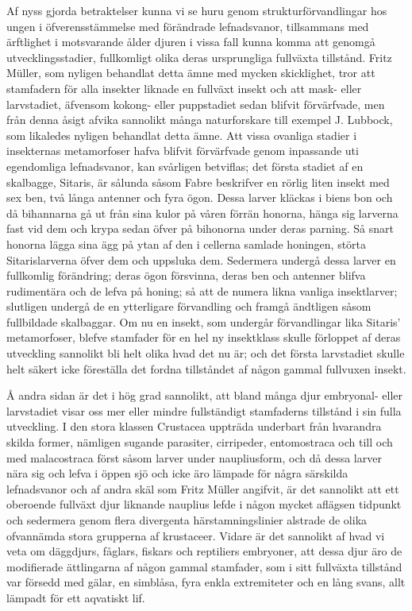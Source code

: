 Af nyss gjorda betraktelser kunna vi se huru genom strukturförvandlingar hos ungen i öfverensstämmelse med förändrade lefnadsvanor, tillsammans med ärftlighet i motsvarande ålder djuren i vissa fall kunna komma att genomgå utvecklingsstadier, fullkomligt olika deras ursprungliga fullväxta tillstånd. Fritz Müller, som nyligen behandlat detta ämne med mycken skicklighet, tror att stamfadern för alla insekter liknade en fullväxt insekt och att mask- eller larvstadiet, äfvensom kokong- eller puppstadiet sedan blifvit förvärfvade, men från denna åsigt afvika sannolikt många naturforskare till exempel J. Lubbock, som likaledes nyligen behandlat detta ämne. Att vissa ovanliga stadier i insekternas metamorfoser hafva blifvit förvärfvade genom inpassande uti egendomliga lefnadsvanor, kan svårligen betviflas; det första stadiet af en skalbagge, Sitaris, är sålunda såsom Fabre beskrifver en rörlig liten insekt med sex ben, två långa antenner och fyra ögon. Dessa larver kläckas i biens bon och då bihannarna gå ut från sina kulor på våren förrän honorna, hänga sig larverna fast vid dem och krypa sedan öfver på bihonorna under deras parning. Så snart honorna lägga sina ägg på ytan af den i cellerna samlade honingen, störta Sitarislarverna öfver dem och uppsluka dem. Sedermera undergå dessa larver en fullkomlig förändring; deras ögon försvinna, deras ben och antenner blifva rudimentära och de lefva på honing; så att de numera likna vanliga insektlarver; slutligen undergå de en ytterligare förvandling och framgå ändtligen såsom fullbildade skalbaggar. Om nu en insekt, som undergår förvandlingar lika Sitaris’ metamorfoser, blefve stamfader för en hel ny insektklass skulle förloppet af deras utveckling sannolikt bli helt olika hvad det nu är; och det första larvstadiet skulle helt säkert icke föreställa det fordna tillståndet af någon gammal fullvuxen insekt.

Å andra sidan är det i hög grad sannolikt, att bland många djur embryonal- eller larvstadiet visar oss mer eller mindre fullständigt stamfaderns tillstånd i sin fulla utveckling. I den stora klassen Crustacea uppträda underbart från hvarandra skilda former, nämligen sugande parasiter, cirripeder, entomostraca och till och med malacostraca först såsom larver under naupliusform, och då dessa larver nära sig och lefva i öppen sjö och icke äro lämpade för några särskilda lefnadsvanor och af andra skäl som Fritz Müller angifvit, är det sannolikt att ett oberoende fullväxt djur liknande nauplius lefde i någon mycket aflägsen tidpunkt och sedermera genom flera divergenta härstamningslinier alstrade de olika ofvannämda stora grupperna af krustaceer. Vidare är det sannolikt af hvad vi veta om däggdjurs, fåglars, fiskars och reptiliers embryoner, att dessa djur äro de modifierade ättlingarna af någon gammal stamfader, som i sitt fullväxta tillstånd var försedd med gälar, en simblåsa, fyra enkla extremiteter och en lång svans, allt lämpadt för ett aqvatiskt lif.

